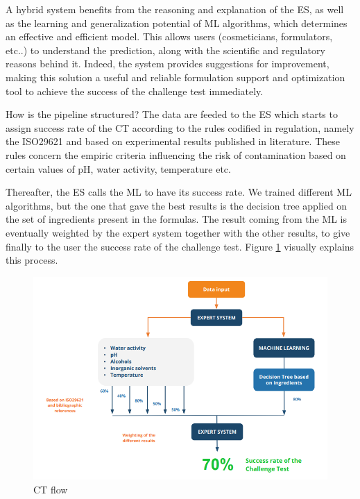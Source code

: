 \documentclass[a4paper,12pt,twoside]{report}
\begin{document}
A hybrid system benefits from the reasoning and explanation of the ES, as well as the learning and generalization potential of ML algorithms, which determines an effective and efficient model. 
This allows users (cosmeticians, formulators, etc..) to understand the prediction, along with the scientific and regulatory reasons behind it. Indeed, the system provides suggestions for improvement, making this solution a useful and reliable formulation support and optimization tool to achieve the success of the challenge test immediately. 

How is the pipeline structured? The data are feeded to the ES which starts to assign success rate of the CT according to the rules codified in regulation, namely the ISO29621 and based on experimental results published in literature. These rules concern the empiric criteria influencing the risk of contamination based on certain values of pH, water activity, temperature etc. 

Thereafter, the ES calls the ML to have its success rate. We trained different ML algorithms, but the one that gave the best results is the decision tree applied on the set of ingredients present in the formulas. The result coming from the ML is eventually weighted by the expert system together with the other results, to give finally to the user the success rate of the challenge test. Figure \ref{ctflow} visually explains this process.

\begin{figure}
		\includegraphics[width=\textwidth]{images/ctFlow}
	\caption[WorkFlow of CT prediction in CF]{CT flow}
	\label{ctflow}
\end{figure}
\end{document}
